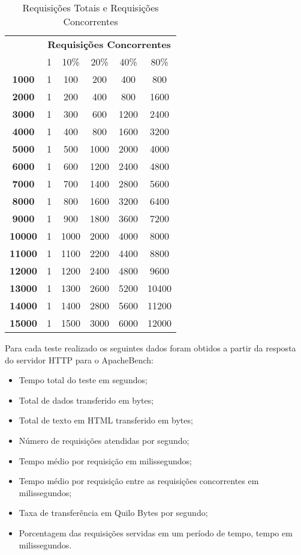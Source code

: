 \begin{table}[htb]
\ABNTEXfontereduzida
\caption[Requisições Totais e Requisições Concorrentes]{Requisições Totais e Requisições Concorrentes}
\label{tab-nivinv}
\begin{tabular}{|>{\bfseries}c|c|c|c|c|c|}
\hline
\multirow{2}{*}{Requisições Totais} & \multicolumn{5}{c|}{\textbf{Requisições Concorrentes}} \\ \cline{2-6}
& 1 & 10\% & 20\% & 40\% & 80\% \\ \hline
1000	 & 1 & 100 & 200 & 400 & 800 \\ \hline
2000 & 1 & 200 & 400 & 800 & 1600 \\ \hline
3000 & 1 & 300 & 600 & 1200 & 2400 \\ \hline
4000	 & 1 & 400 & 800 & 1600 & 3200 \\ \hline
5000 & 1 & 500 & 1000 & 2000 & 4000 \\ \hline
6000 & 1 & 600 & 1200 & 2400 & 4800 \\ \hline
7000 & 1	 & 700 & 1400 & 2800 & 5600 \\ \hline
8000 & 1 & 800 & 1600 & 3200 & 6400 \\ \hline
9000 & 1 & 900 & 1800 & 3600 & 7200 \\ \hline
10000 & 1 & 1000 & 2000 & 4000 & 8000 \\ \hline
11000 & 1 & 1100 & 2200 & 4400 & 8800 \\ \hline
12000 & 1 & 1200 & 2400 & 4800 & 9600 \\ \hline
13000 & 1 & 1300 & 2600 & 5200 & 10400 \\ \hline
14000 & 1 & 1400 & 2800 & 5600 & 11200 \\ \hline
15000 & 1 & 1500 & 3000 & 6000 & 12000 \\ \hline

\end{tabular}
\end{table}
 
Para cada teste realizado os seguintes dados foram obtidos a partir da resposta do servidor HTTP para o ApacheBench:

\begin{itemize}
\item Tempo total do teste em segundos;
\item Total de dados transferido em bytes;
\item Total de texto em HTML transferido em bytes;
\item Número de requisições atendidas por segundo;
\item Tempo médio por requisição em milissegundos;
\item Tempo médio por requisição entre as requisições concorrentes em milissegundos;
\item Taxa de transferência em Quilo Bytes por segundo;
\item Porcentagem das requisições servidas em um período de tempo, tempo em milissegundos.
\end{itemize}
